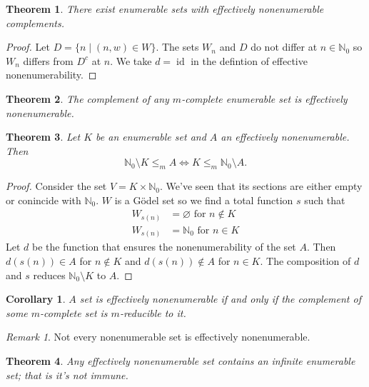 \documentclass[10pt, letterpaper]{article}
\newcommand{\N}{\mathbb{N}}
\newtheorem{thm}{Theorem}
\newtheorem{cor}{Corollary}
\theoremstyle{remark}
\newtheorem{rem}{Remark}
\theoremstyle{definition}
\begin{document}
    \begin{thm}
        There exist enumerable sets with effectively nonenumerable complements.
    \end{thm}

    \begin{proof}
        Let $D = \{n \mid (n,w) \in W\}$. The sets $W_n$ and $D$ do not differ at $n \in \N_0$ so $W_n$ differs from $D^c$ at $n$. We take 
        $d = \operatorname{id}$ in the defintion of effective nonenumerability.
    \end{proof}

    \begin{thm}
        The complement of any $m$-complete enumerable set is effectively nonenumerable.
    \end{thm}

    \begin{thm}
        Let $K$ be an enumerable set and $A$ an effectively nonenumerable. Then 
        \[
            \N_0 \setminus K \leq_m A \Leftrightarrow K \leq_m \N_0 \setminus A.
        \]
    \end{thm}

    \begin{proof}
        Consider the set $V = K \times \N_0$. We've seen that its sections are either empty or conincide with $\N_0$. $W$ is a G\"{o}del set so 
        we find a total function $s$ such that 
        \begin{align*}
            W_{s(n)} &= \varnothing \text{ for } n \notin K \\
            W_{s(n)} &= \N_0 \text{ for } n \in K
        \end{align*}
        Let $d$ be the function that ensures the nonenumerability of the set $A$. Then $d(s(n)) \in A$ for $n \notin K$ and 
        $d(s(n)) \notin A$ for $n \in K$. The composition of $d$ and $s$ reduces $\N_0 \setminus K$ to $A$.
    \end{proof}

    \begin{cor}
        $A$ set is effectively nonenumerable if and only if the complement of some $m$-complete set is $m$-reducible to it.
    \end{cor}

    \begin{rem}
        Not every nonenumerable set is effectively nonenumerable.
    \end{rem}

    \begin{thm}
        Any effectively nonenumerable set contains an infinite enumerable set; that is it's not immune.
    \end{thm}
\end{document}
